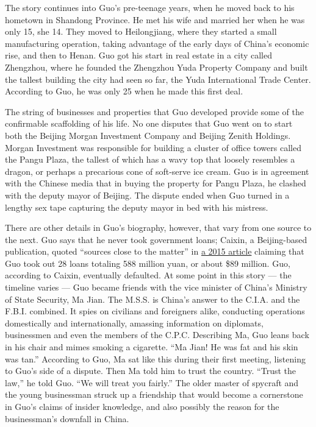 The story continues into Guo's pre-teenage years, when he moved back to
his hometown in Shandong Province. He met his wife and married her when
he was only 15, she 14. They moved to Heilongjiang, where they started a
small manufacturing operation, taking advantage of the early days of
China's economic rise, and then to Henan. Guo got his start in real
estate in a city called Zhengzhou, where he founded the Zhengzhou Yuda
Property Company and built the tallest building the city had seen so
far, the Yuda International Trade Center. According to Guo, he was only
25 when he made this first deal.

The string of businesses and properties that Guo developed provide some
of the confirmable scaffolding of his life. No one disputes that Guo
went on to start both the Beijing Morgan Investment Company and Beijing
Zenith Holdings. Morgan Investment was responsible for building a
cluster of office towers called the Pangu Plaza, the tallest of which
has a wavy top that loosely resembles a dragon, or perhaps a precarious
cone of soft-serve ice cream. Guo is in agreement with the Chinese media
that in buying the property for Pangu Plaza, he clashed with the deputy
mayor of Beijing. The dispute ended when Guo turned in a lengthy sex
tape capturing the deputy mayor in bed with his mistress.

There are other details in Guo's biography, however, that vary from one
source to the next. Guo says that he never took government loans;
Caixin, a Beijing-based publication, quoted ``sources close to the
matter'' in
\href{https://www.caixinglobal.com/2015-03-26/101012577.html}{a 2015
article} claiming that Guo took out 28 loans totaling 588 million yuan,
or about \$89 million. Guo, according to Caixin, eventually defaulted.
At some point in this story --- the timeline varies --- Guo became
friends with the vice minister of China's Ministry of State Security, Ma
Jian. The M.S.S. is China's answer to the C.I.A. and the F.B.I.
combined. It spies on civilians and foreigners alike, conducting
operations domestically and internationally, amassing information on
diplomats, businessmen and even the members of the C.P.C. Describing Ma,
Guo leans back in his chair and mimes smoking a cigarette. ``Ma Jian! He
was fat and his skin was tan.'' According to Guo, Ma sat like this
during their first meeting, listening to Guo's side of a dispute. Then
Ma told him to trust the country. ``Trust the law,'' he told Guo. ``We
will treat you fairly.'' The older master of spycraft and the young
businessman struck up a friendship that would become a cornerstone in
Guo's claims of insider knowledge, and also possibly the reason for the
businessman's downfall in China.

